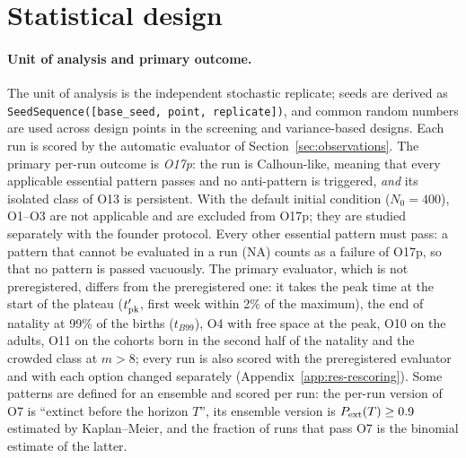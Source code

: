 \section{Statistical design}
\label{sec:stats}

\paragraph{Unit of analysis and primary outcome.}
The unit of analysis is the independent stochastic replicate; seeds are derived as
\texttt{SeedSequence([base\_seed, point, replicate])}, and common random numbers are used across design points in the
screening and variance-based designs. Each run is scored by the automatic evaluator of
Section~\ref{sec:observations}. The primary per-run outcome is \emph{O17p}: the run is Calhoun-like, meaning that
every applicable essential pattern passes and no anti-pattern is triggered, \emph{and} its isolated class of O13 is
persistent. With the default initial condition ($N_0=400$), O1--O3 are not applicable and are excluded from O17p;
they are studied separately with the founder protocol. Every other essential pattern must pass: a pattern that
cannot be evaluated in a run (NA) counts as a failure of O17p, so that no pattern is passed vacuously.
The primary evaluator, which is not preregistered, differs from the preregistered one: it takes the peak time at the start of the plateau ($t'_{\rm pk}$, first
week within 2\% of the maximum), the end of natality at 99\% of the births ($t_{B99}$), O4 with free space at the
peak, O10 on the adults, O11 on the cohorts born in the second half of the natality and the crowded class at $m>8$;
every run is also scored with the preregistered evaluator and with each option changed separately
(Appendix~\ref{app:res-rescoring}). Some patterns are defined for an ensemble and scored per run: the per-run
version of O7 is ``extinct before the horizon $T$'', its ensemble version is $P_{\rm ext}(T)\ge0.9$ estimated by
Kaplan--Meier, and the fraction of runs that pass O7 is the binomial estimate of the latter.

